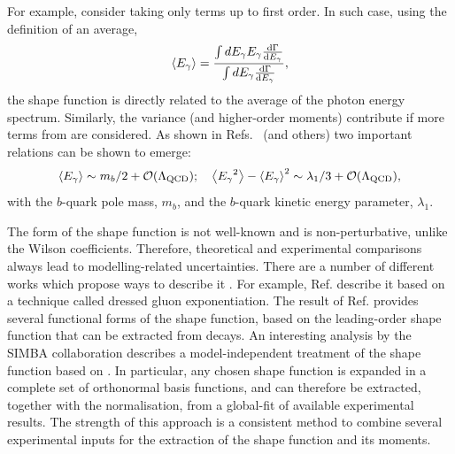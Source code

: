 For example, consider taking only terms up to first order.
In such case, using the definition of an average,
\begin{equation}
    \expval{{\ensuremath{E_{\gamma}}}} = \frac{\int d{E_{\gamma}} {E_{\gamma}} \dv{\Gamma}{{\ensuremath{E_{\gamma}}}}}{\int d{E_{\gamma}} \dv{\Gamma}{{\ensuremath{E_{\gamma}}}}},
\end{equation}
the shape function is directly related to the average of the photon energy spectrum.
Similarly, the variance (and higher-order moments) contribute if more terms from  are considered.
As shown in Refs.~\cite{Bauer:1997fe,Kapustin:1995fk} (and others) two important relations can be shown to emerge:
\begin{equation}
    \expval{\Egamma} \sim m_b/2+\order(\Lambda_{\mathrm{QCD}}); \quad \expval{\Egamma^2}-\expval{\Egamma}^2 \sim \lambda_1/3+\order(\Lambda_{\mathrm{QCD}}),
\end{equation}
with the $b$-quark pole mass, $m_b$, and the $b$-quark kinetic energy parameter, $\lambda_1$.

The form of the shape function is not well-known and is non-perturbative, unlike the Wilson coefficients.
Therefore, theoretical and experimental comparisons always lead to modelling-related uncertainties.
There are a number of different works which propose ways to describe it \cite{Benson:2004sg,Lange:2005yw,Andersen:2005mj,Gambino:2007rp,Aglietti:2007ik,Bernlochner:2020jlt}.
For example, Ref. \cite{Andersen:2005mj} describe it based on a technique called dressed gluon exponentiation.
The result of Ref. \cite{Lange:2005yw} provides several functional forms of the shape function, based on the leading-order shape function that can be extracted from \BtoXsgamma decays.
An interesting analysis by the SIMBA collaboration \cite{Bernlochner:2020jlt} describes a model-independent treatment of the shape function based on .
In particular, any chosen shape function is expanded in a complete set of orthonormal basis functions, and can therefore be extracted, together with the normalisation, from a global-fit of available experimental results.
The strength of this approach is a consistent method to combine several experimental inputs for the extraction of the shape function and its moments.

